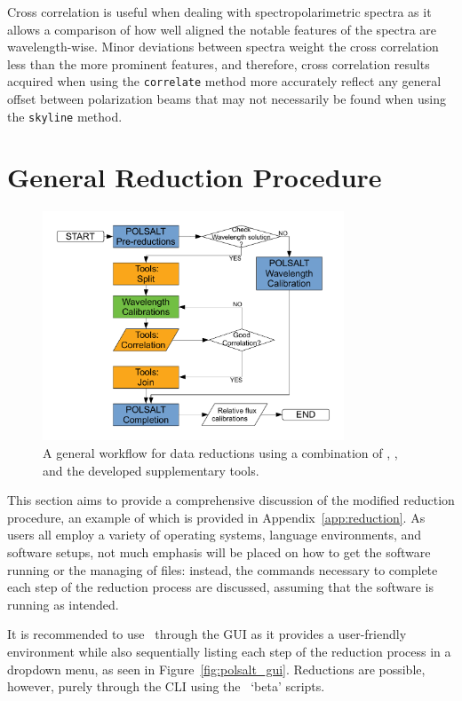 Cross correlation is useful when dealing with spectropolarimetric spectra as it allows a comparison of how well aligned the notable features of the spectra are wavelength-wise. Minor deviations between spectra weight the cross correlation less than the more prominent features, and therefore, cross correlation results acquired when using the \texttt{correlate} method more accurately reflect any general offset between polarization beams that may not necessarily be found when using the \texttt{skyline} method.

\section{General Reduction Procedure}\label{sec:red_proc}

\begin{figure}[t]
    \centering
    \includegraphics[width = 0.8\textwidth]{figures/3_new_workflow.pdf}
    \caption{A general workflow for data reductions using a combination of \polsalt, \iraf, and the developed supplementary tools.}
    \label{fig:new_workflow}
\end{figure}

This section aims to provide a comprehensive discussion of the modified reduction procedure, an example of which is provided in Appendix~\ref{app:reduction}. As users all employ a variety of operating systems, language environments, and software setups, not much emphasis will be placed on how to get the software running or the managing of files: instead, the commands necessary to complete each step of the reduction process are discussed, assuming that the software is running as intended.

It is recommended to use \polsalt\ through the \gls{GUI} as it provides a user-friendly environment while also sequentially listing each step of the reduction process in a dropdown menu, as seen in Figure~\ref{fig:polsalt_gui}. Reductions are possible, however, purely through the \gls{CLI} using the \polsalt\ `beta' scripts.

